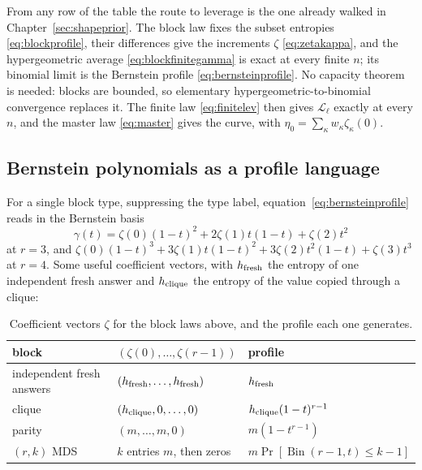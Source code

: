 \documentclass[11pt]{article}
\begin{document}
From any row of the table the route to leverage is the one already
walked in Chapter~\ref{sec:shapeprior}. The block law fixes the
subset entropies \eqref{eq:blockprofile}, their differences give the
increments $\zeta$ \eqref{eq:zetakappa}, and the hypergeometric average
\eqref{eq:blockfinitegamma} is exact at every finite $n$; its
binomial limit is the Bernstein profile \eqref{eq:bernsteinprofile}.
No capacity theorem is needed: blocks are bounded, so elementary
hypergeometric-to-binomial convergence replaces it. The finite law
\eqref{eq:finitelev} then gives $\mathcal L_\ell$ exactly at
every $n$, and the master law \eqref{eq:master} gives the curve, with
$\eta_0 = \sum_\kappa w_\kappa \zeta_\kappa(0)$.

\subsection{Bernstein polynomials as a profile language}

For a single block type, suppressing the type label,
equation~\eqref{eq:bernsteinprofile} reads in the Bernstein basis
\cite{lorentz}
%
\begin{equation}
  \gamma(t) = \zeta(0)(1-t)^2 + 2\zeta(1)t(1-t) + \zeta(2)t^2
  \label{eq:bernstein3}
\end{equation}
%
at $r = 3$, and
$\zeta(0)(1-t)^3 + 3\zeta(1)t(1-t)^2 + 3\zeta(2)t^2(1-t) + \zeta(3)t^3$
at $r = 4$. Some useful coefficient vectors, with $h_{\rm fresh}$ the
entropy of one independent fresh answer and $h_{\rm clique}$ the
entropy of the value copied through a clique:

\begin{table}[H]
\begin{center}
\begin{tabular}{lll}
\toprule
block & $(\zeta(0),\ldots,\zeta(r-1))$ & profile \\
\midrule
independent fresh answers
  & $(h_{\rm fresh},\ldots,h_{\rm fresh})$ & $h_{\rm fresh}$ \\
clique & $(h_{\rm clique},0,\ldots,0)$
  & $h_{\rm clique}(1-t)^{r-1}$ \\
parity & $(m,\ldots,m,0)$ & $m(1-t^{r-1})$ \\
$(r,k)$ MDS & $k$ entries $m$, then zeros
  & $m\Pr[\operatorname{Bin}(r-1,t)\le k-1]$ \\
\bottomrule
\end{tabular}
\end{center}
\caption{Coefficient vectors $\zeta$ for the block laws above, and the profile each one generates.}
\label{tab:zeta}
\end{table}
\end{document}
